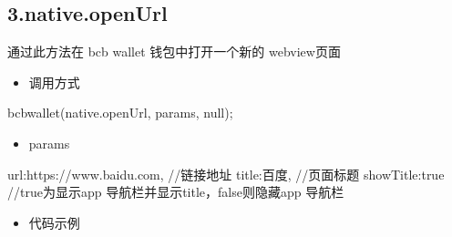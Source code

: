 \documentclass[letterpaper,10pt,english]{sphinxmanual}
\begin{document}
\begin{sphinxVerbatim}[commandchars=\\\{\}]
    
\end{sphinxVerbatim}


\subsection{3.native.openUrl}
\label{\detokenize{jsapi:native-openurl}}
通过此方法在 bcb wallet 钱包中打开一个新的 webview页面
\begin{itemize}
\item {} 
调用方式

\end{itemize}

\begin{sphinxVerbatim}[commandchars=\\\{\}]
bcbwallet(\PYGZsq{}native.openUrl\PYGZsq{}, params, null);
\end{sphinxVerbatim}
\begin{itemize}
\item {} 
params

\end{itemize}

\begin{sphinxVerbatim}[commandchars=\\\{\}]
\PYGZob{}
  \PYGZdq{}url\PYGZdq{}:\PYGZdq{}https://www.baidu.com\PYGZdq{}, //链接地址
  \PYGZdq{}title\PYGZdq{}:\PYGZdq{}百度\PYGZdq{}, //页面标题
  \PYGZdq{}showTitle\PYGZdq{}:true  //true为显示app 导航栏并显示title，false则隐藏app 导航栏
\PYGZcb{}
\end{sphinxVerbatim}
\begin{itemize}
\item {} 
代码示例

\end{itemize}

\begin{sphinxVerbatim}[commandchars=\\\{\}]
 
 
\end{sphinxVerbatim}
\end{document}
